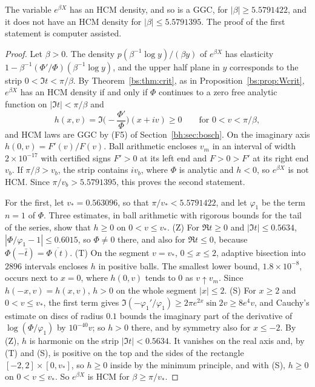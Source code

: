 \begin{proposition}\label{fm:prop:hcm}
The variable $e^{\beta X}$ has an HCM density, and so is a GGC, for $|\beta|\ge5.5791422$, and it does not have an HCM density for $|\beta|\le5.5791395$. The proof of the first statement is computer assisted.
\end{proposition}

\begin{proof}
Let $\beta>0$. The density $p(\beta^{-1}\log y)/(\beta y)$ of $e^{\beta X}$ has elasticity $1-\beta^{-1}(\Phi'/\Phi)(\beta^{-1}\log y)$, and the upper half plane in $y$ corresponds to the strip $0<\Im t<\pi/\beta$. By Theorem~\ref{bs:thm:crit}, as in Proposition~\ref{bs:prop:Wcrit}, $e^{\beta X}$ has an HCM density if and only if $\Phi$ continues to a zero free analytic function on $|\Im t|<\pi/\beta$ and
\[
h(x,v)=\Im\Big(-\frac{\Phi'}{\Phi}\Big)(x+iv)\ge0\qquad\text{for }0<v<\pi/\beta ,
\]
and HCM laws are GGC by (F5) of Section~\ref{bh:sec:bosch}. On the imaginary axis $h(0,v)=F'(v)/F(v)$. Ball arithmetic \cite{Arb} encloses $v_m$ in an interval of width $2\times10^{-17}$ with certified signs $F'>0$ at its left end and $F>0>F'$ at its right end $v_b$. If $\pi/\beta>v_b$, the strip contains $iv_b$, where $\Phi$ is analytic and $h<0$, so $e^{\beta X}$ is not HCM. Since $\pi/v_b>5.5791395$, this proves the second statement.

For the first, let $v_*=0.563096$, so that $\pi/v_*<5.5791422$, and let $\varphi_1$ be the term $n=1$ of $\Phi$. Three estimates, in ball arithmetic with rigorous bounds for the tail of the series, show that $h\ge0$ on $0<v\le v_*$.
(Z) For $\Re t\ge0$ and $|\Im t|\le0.5634$, $|\Phi/\varphi_1-1|\le0.6015$, so $\Phi\ne0$ there, and also for $\Re t\le0$, because $\Phi(-\bar t)=\overline{\Phi(t)}$.
(T) On the segment $v=v_*$, $0\le x\le2$, adaptive bisection into $2896$ intervals encloses $h$ in positive balls. The smallest lower bound, $1.8\times10^{-8}$, occurs next to $x=0$, where $h(0,v)$ tends to $0$ as $v\uparrow v_m$. Since $h(-x,v)=h(x,v)$, $h>0$ on the whole segment $|x|\le2$.
(S) For $x\ge2$ and $0<v\le v_*$, the first term gives $\Im(-\varphi_1'/\varphi_1)\ge2\pi e^{2x}\sin2v\ge8e^4v$, and Cauchy's estimate on discs of radius $0.1$ bounds the imaginary part of the derivative of $\log(\Phi/\varphi_1)$ by $10^{-40}v$; so $h>0$ there, and by symmetry also for $x\le-2$.
By (Z), $h$ is harmonic on the strip $|\Im t|<0.5634$. It vanishes on the real axis and, by (T) and (S), is positive on the top and the sides of the rectangle $[-2,2]\times[0,v_*]$, so $h\ge0$ inside by the minimum principle, and with (S), $h\ge0$ on $0<v\le v_*$. So $e^{\beta X}$ is HCM for $\beta\ge\pi/v_*$.
\end{proof}

